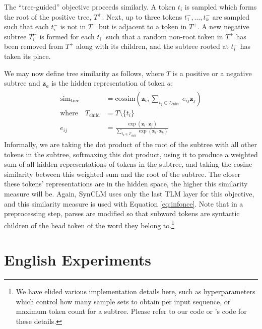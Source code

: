 \documentclass[11pt]{article}
\begin{document}
The ``tree-guided'' objective proceeds similarly.
A token $t_i$ is sampled which forms the root of the positive tree, $T^+$.
Next, up to three tokens $t^-_1, \ldots, t^-_k$ are sampled such that each $t^-_i$ is not in $T^+$ but is adjacent to a token in $T^+$.
A new negative subtree $T^-_i$ is formed for each $t^-_i$ such that a random non-root token in $T^+$ has been removed from $T^+$ along with its children, and the subtree rooted at $t^-_i$ has taken its place.

We may now define tree similarity as follows, where $T$ is a positive or a negative subtree and $\mathbf{z}_a$ is the hidden representation of token $a$:
\begin{align}
\begin{split}
    \mathrm{sim}_\mathrm{tree} &= \mathrm{cossim}(\mathbf{z}_i, {\textstyle \sum}_{t_j \in T_\mathrm{child}}\:e_{ij}\mathbf{z}_j) \\
    \text{where}\quad T_\mathrm{child} &= T \setminus \{t_i\} \\
    e_{ij} &= \frac{\exp\left(\mathbf{z}_i \cdot \mathbf{z}_j\right)}{\sum_{t_k\in T_\mathrm{child}} \exp\left(\mathbf{z}_i \cdot \mathbf{z}_k\right)}
\end{split}
\end{align}
Informally, we are taking the dot product of the root of the subtree with all other tokens in the subtree, softmaxing this dot product, using it to produce a weighted sum of all hidden representations of tokens in the subtree, and taking the cosine similarity between this weighted sum and the root of the subtree.
The closer these tokens' representations are in the hidden space, the higher this similarity measure will be.
Again, SynCLM uses only the last TLM layer for this objective, and this similarity measure is used with Equation \ref{eq:infonce}.
Note that in a preprocessing step, parses are modified so that subword tokens are syntactic children of the head token of the word they belong to.\footnote{We have elided various implementation details here, such as hyperparameters which control how many sample sets to obtain per input sequence, or maximum token count for a subtree. Please refer to our code or \citet{zhang-etal-2022-syntax}'s code for these details.}

\section{English Experiments}
\label{sec:english}
\end{document}
